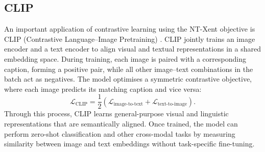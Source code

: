 \subsection{CLIP}
An important application of contrastive learning using the NT-Xent objective is CLIP (Contrastive Language--Image Pretraining) \cite{}. CLIP jointly trains an image encoder and a text encoder to align visual and textual representations in a shared embedding space.  
During training, each image is paired with a corresponding caption, forming a positive pair, while all other image--text combinations in the batch act as negatives. The model optimises a symmetric contrastive objective, where each image predicts its matching caption and vice versa:
\[
\mathcal{L}_{\text{CLIP}} = \frac{1}{2}(\mathcal{L}_{\text{image-to-text}} + \mathcal{L}_{\text{text-to-image}}).
\]
Through this process, CLIP learns general-purpose visual and linguistic representations that are semantically aligned. Once trained, the model can perform zero-shot classification and other cross-modal tasks by measuring similarity between image and text embeddings without task-specific fine-tuning.